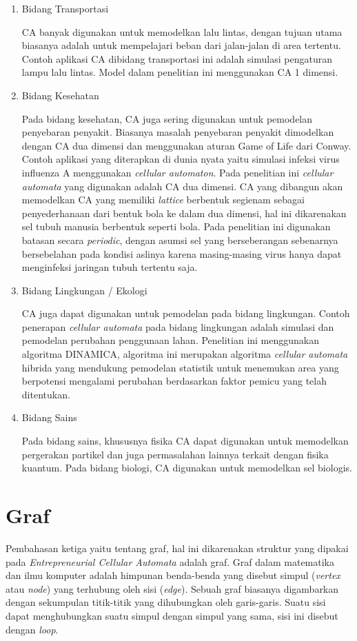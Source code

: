 		\begin{enumerate}
			\item Bidang Transportasi
			
			CA banyak digunakan untuk memodelkan lalu lintas, dengan tujuan utama biasanya adalah untuk mempelajari beban dari jalan-jalan di area tertentu. Contoh aplikasi CA dibidang transportasi ini adalah simulasi pengaturan lampu lalu lintas. Model dalam penelitian ini menggunakan CA 1 dimensi.
			
			\item Bidang Kesehatan
			
			Pada bidang kesehatan, CA juga sering digunakan untuk pemodelan penyebaran penyakit. Biasanya masalah penyebaran penyakit dimodelkan dengan CA dua dimensi dan menggunakan aturan Game of Life dari Conway. Contoh aplikasi yang diterapkan di dunia nyata yaitu simulasi infeksi virus influenza A menggunakan \textit{cellular automaton}. Pada penelitian ini \textit{cellular automata} yang digunakan adalah CA dua dimensi. CA yang dibangun akan memodelkan CA yang memiliki \textit{lattice} berbentuk segienam sebagai penyederhanaan dari bentuk bola ke dalam dua dimensi, hal ini dikarenakan sel tubuh manusia berbentuk seperti bola. Pada penelitian ini digunakan batasan secara \textit{periodic}, dengan asumsi sel yang berseberangan sebenarnya bersebelahan pada kondisi aslinya karena masing-masing virus hanya dapat menginfeksi jaringan tubuh tertentu saja. \cite{referensiCA1}
			
			\item Bidang Lingkungan / Ekologi
			
			CA juga dapat digunakan untuk pemodelan pada bidang lingkungan. Contoh penerapan \textit{cellular automata} pada bidang lingkungan adalah simulasi dan pemodelan perubahan penggunaan lahan. Penelitian ini menggunakan algoritma DINAMICA, algoritma ini merupakan algoritma \textit{cellular automata} hibrida yang mendukung pemodelan statistik untuk menemukan area yang berpotensi mengalami perubahan berdasarkan faktor pemicu yang telah ditentukan.
			
			\item Bidang Sains
			
			Pada bidang sains, khususnya fisika CA dapat digunakan untuk memodelkan pergerakan partikel dan juga permasalahan lainnya terkait dengan fisika kuantum. Pada bidang biologi, CA digunakan untuk memodelkan sel biologis.
		\end{enumerate}
		
\section{Graf}
\label{sec:graf}
Pembahasan ketiga yaitu tentang graf, hal ini dikarenakan struktur yang dipakai pada \textit{Entrepreneurial Cellular Automata} adalah graf. Graf dalam matematika dan ilmu komputer adalah himpunan benda-benda yang disebut simpul (\textit{vertex} atau \textit{node}) yang terhubung oleh sisi (\textit{edge}). Sebuah graf biasanya digambarkan dengan sekumpulan titik-titik yang dihubungkan oleh garis-garis. Suatu sisi dapat menghubungkan suatu simpul dengan simpul yang sama, sisi ini disebut dengan \textit{loop}.

